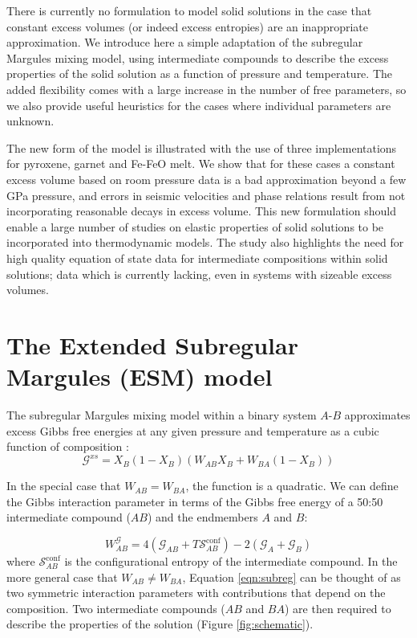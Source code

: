\documentclass[review]{elsarticle}
\begin{document}
There is currently no formulation to model solid solutions in the case that constant excess volumes (or indeed excess entropies) are an inappropriate approximation. We introduce here a simple adaptation of the subregular Margules mixing model, using intermediate compounds to describe the excess properties of the solid solution as a function of pressure and temperature. The added flexibility comes with a large increase in the number of free parameters, so we also provide useful heuristics for the cases where individual parameters are unknown.

The new form of the model is illustrated with the use of three implementations for pyroxene, garnet and Fe-FeO melt. We show that for these cases a constant excess volume based on room pressure data is a bad approximation beyond a few GPa pressure, and errors in seismic velocities and phase relations result from not incorporating reasonable decays in excess volume. This new formulation should enable a large number of studies on elastic properties of solid solutions to be incorporated into thermodynamic models. The study also highlights the need for high quality equation of state data for intermediate compositions within solid solutions; data which is currently lacking, even in systems with sizeable excess volumes.

\section{The Extended Subregular Margules (ESM) model}
The subregular Margules mixing model within a binary system $A$-$B$ approximates excess Gibbs free energies at any given pressure and temperature as a cubic function of composition \citep{HW1989}:
\begin{equation}
  \mathcal{G}^{xs} = X_B (1-X_B) \left(W_{AB} X_B + W_{BA} (1-X_B) \right)
  \label{eqn:subreg}
\end{equation}

In the special case that $W_{AB} = W_{BA}$, the function is a quadratic. We can define the Gibbs interaction parameter in terms of the Gibbs free energy of a 50:50 intermediate compound ($AB$) and the endmembers $A$ and $B$:

\begin{equation}
  W^{\mathcal{G}}_{AB} = 4(\mathcal{G}_{AB} + T\mathcal{S}^{\textrm{conf}}_{AB}) - 2(\mathcal{G}_A + \mathcal{G}_B)
\end{equation}
\noindent where $\mathcal{S}^{\textrm{conf}}_{AB}$ is the configurational entropy of the intermediate compound. In the more general case that $W_{AB} \neq W_{BA}$, Equation \ref{eqn:subreg} can be thought of as two symmetric interaction parameters with contributions that depend on the composition. Two intermediate compounds ($AB$ and $BA$) are then required to describe the properties of the solution (Figure \ref{fig:schematic}).
\end{document}
